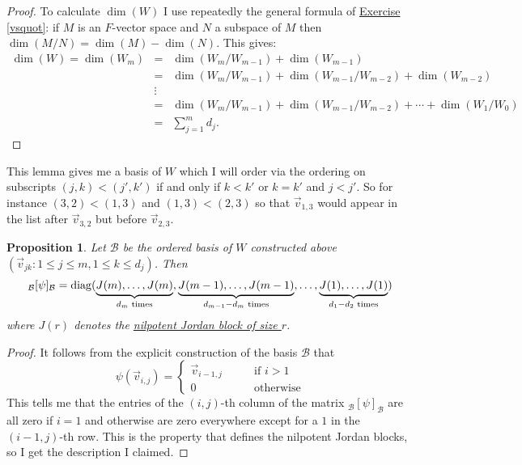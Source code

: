 \documentclass[11pt]{amsbook}
\newtheorem{proposition}[theorem]{Proposition}
\theoremstyle{definition}
\begin{document}
\begin{proof}
To calculate $\dim (W)$ I use repeatedly the general formula of \hyperref[vsquot]{Exercise \ref{vsquot}}: if $M$ is an $F$-vector space and $N$ a subspace of $M$ then $\dim (M/N) = \dim (M) - \dim (N)$. This gives:
\begin{eqnarray*}
\dim (W) = \dim (W_m) & =& \dim (W_m/W_{m-1}) + \dim (W_{m-1}) \\ & = & \dim(W_m/W_{m-1}) + \dim (W_{m-1}/W_{m-2}) + \dim (W_{m-2}) \\ & \vdots & \\ & = &  \dim(W_m/W_{m-1}) + \dim (W_{m-1}/W_{m-2}) + \cdots + \dim (W_1/W_0) \\ &=& \sum_{j=1}^m d_j. \end{eqnarray*}
\vspace{-0.7cm}

\end{proof}

This lemma gives me a basis of $W$ which I will order via the ordering on subscripts $(j,k) < (j',k')$ if and only if $k<k'$ or $k=k'$ and $j< j'$. So for instance $(3,2) < (1,3)$ and $(1,3)< (2,3)$ so that $\vec{v}_{1,3}$ would appear in the list after $\vec{v}_{3,2}$ but before $\vec{v}_{2,3}$.

\begin{proposition} \label{nilpJN}
Let $\mathcal{B}$ be the ordered basis of $W$ constructed above $( \vec{v}_{jk} : 1\leqslant j \leqslant m, 1\leqslant k \leqslant d_j )$. Then $${}_{\mathcal{B}}[\psi]_{\mathcal{B}} = {\rm diag}( \underbrace{J(m), \ldots , J(m)}_{d_m\text{ times}}, \underbrace{J(m-1), \ldots , J(m-1)}_{d_{m-1}-d_m \text{ times}}, \ldots , \underbrace{J(1), \ldots , J(1)}_{d_1-d_2 \text{ times}})$$ where $J(r)$ denotes the \hyperref[JNblock]{nilpotent Jordan block of size $r$}.
\end{proposition}

\begin{proof}
It follows from the explicit construction of the basis $\mathcal{B}$ that $$\psi (\vec{v}_{i,j}) = \begin{cases} \vec{v}_{i-1, j} \qquad & \text{if }i>1 \\ 0 & \text{otherwise} \end{cases}$$ This tells me that the entries of the $(i,j)$-th column of the matrix ${}_{\mathcal{B}}[\psi]_{\mathcal{B}} $ are all zero if $i=1$ and otherwise are zero everywhere except for a $1$ in the $(i-1,j)$-th row. This is the property that defines the nilpotent Jordan blocks, so I get the description I claimed.
\end{proof}
\end{document}
